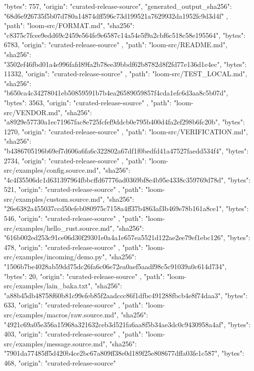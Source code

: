 {{      "bytes": 757,
      "origin": "curated-release-source",
      "generated_output_sha256": "68d6e926735f5b07d780a14874dff596c73d199521a7629932da1952fc9d3d4f"
    },
    {
      "path": "loom-src/FORMAT.md",
      "sha256": "c8375c7fcee9edd69c2459e564fe9e6587c14a54e5f9a2cbf6c518c58e195564",
      "bytes": 6783,
      "origin": "curated-release-source"
    },
    {
      "path": "loom-src/README.md",
      "sha256": "3502ef46fbd01a4e996fafd89fa2b78ee39bbdf62b8782d8f2fd77e136d1e4ec",
      "bytes": 11332,
      "origin": "curated-release-source"
    },
    {
      "path": "loom-src/TEST_LOCAL.md",
      "sha256": "b650ca4c34278041eb50859591b7b4ea26589059857f4cda1efc6d3aa8c5b07d",
      "bytes": 3563,
      "origin": "curated-release-source"
    },
    {
      "path": "loom-src/VENDOR.md",
      "sha256": "a8929e57730a1ec71967fac8e725fcfef9ddcb0e795b400d4fa2ef298b6fc20b",
      "bytes": 1270,
      "origin": "curated-release-source"
    },
    {
      "path": "loom-src/VERIFICATION.md",
      "sha256": "b4386705196b69ef7d606a6fa6c322802a67df1f0bedfd41a47527faedd534f4",
      "bytes": 2734,
      "origin": "curated-release-source"
    },
    {
      "path": "loom-src/examples/config.source.md",
      "sha256": "4c4f35506dc1d631397964fbbcffd67776ad0369bf8e4b95e4338c359769d78d",
      "bytes": 521,
      "origin": "curated-release-source"
    },
    {
      "path": "loom-src/examples/custom.source.md",
      "sha256": "26e6382a455037ccd50efeb080975c7158a4ff37b4863af3b469e78b161a8ce1",
      "bytes": 546,
      "origin": "curated-release-source"
    },
    {
      "path": "loom-src/examples/hello_rust.source.md",
      "sha256": "616b002ed253c91ce06d30f29301e0a4a1e657ea5521d122ae2ee79ef1ebc126",
      "bytes": 478,
      "origin": "curated-release-source"
    },
    {
      "path": "loom-src/examples/incoming/demo.py",
      "sha256": "1506b7be4028ab59dd75dc26fa6c06e72ea0aef5aadf98c5c91039a0c614d734",
      "bytes": 20,
      "origin": "curated-release-source"
    },
    {
      "path": "loom-src/examples/lain_baka.txt",
      "sha256": "a88b45db48758f60b81c99efeb85f2aadccc86f1dfbc491288fbcb4e8f74daa3",
      "bytes": 633,
      "origin": "curated-release-source"
    },
    {
      "path": "loom-src/examples/macros/raw.source.md",
      "sha256": "4921c69a05e356a15968a321632ceb3d521fa6aa8f5b34ae3dc0c9430958a4af",
      "bytes": 403,
      "origin": "curated-release-source"
    },
    {
      "path": "loom-src/examples/message.source.md",
      "sha256": "7901da77485ff5d420b4ce2bc67a809ff38e0d189f25e808677dffa03fe1c587",
      "bytes": 468,
      "origin": "curated-release-source"
}}
